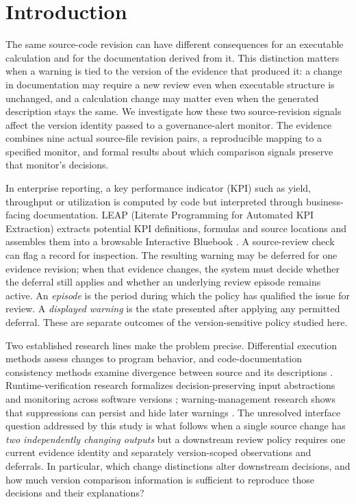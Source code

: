 \documentclass[preprint,11pt]{elsarticle}
\begin{document}
\section{Introduction}\label{sec:introduction}
The same source-code revision can have different consequences for an executable calculation and for the documentation derived from it. This distinction matters when a warning is tied to the version of the evidence that produced it: a change in documentation may require a new review even when executable structure is unchanged, and a calculation change may matter even when the generated description stays the same. We investigate how these two source-revision signals affect the version identity passed to a governance-alert monitor. The evidence combines nine actual source-file revision pairs, a reproducible mapping to a specified monitor, and formal results about which comparison signals preserve that monitor's decisions.

In enterprise reporting, a key performance indicator (KPI) such as yield, throughput or utilization is computed by code but interpreted through business-facing documentation. LEAP (Literate Programming for Automated KPI Extraction) extracts potential KPI definitions, formulas and source locations and assembles them into a browsable Interactive Bluebook \cite{mouawad2026architecture}. A source-review check can flag a record for inspection. The resulting warning may be deferred for one evidence revision; when that evidence changes, the system must decide whether the deferral still applies and whether an underlying review episode remains active. An \emph{episode} is the period during which the policy has qualified the issue for review. A \emph{displayed warning} is the state presented after applying any permitted deferral. These are separate outcomes of the version-sensitive policy studied here.

Two established research lines make the problem precise. Differential execution methods assess changes to program behavior, and code-documentation consistency methods examine divergence between source and its descriptions \cite{groninger2025changeguard,chen2024cocc}. Runtime-verification research formalizes decision-preserving input abstractions and monitoring across software versions \cite{henzinger2022abstract,guan2025imop}; warning-management research shows that suppressions can persist and hide later warnings \cite{hu2025suppressed}. The unresolved interface question addressed by this study is what follows when a single source change has \emph{two independently changing outputs} but a downstream review policy requires one current evidence identity and separately version-scoped observations and deferrals. In particular, which change distinctions alter downstream decisions, and how much version comparison information is sufficient to reproduce those decisions and their explanations?
\end{document}
